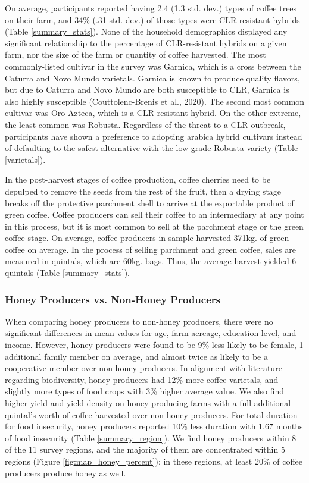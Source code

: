 \documentclass[../main.tex]{subfiles}
\begin{document}
On average, participants reported having 2.4 (1.3 std. dev.) types of coffee trees on their farm, and 34\% (.31 std. dev.) of those types were CLR-resistant hybrids (Table \ref{summary_stats}). None of the household demographics displayed any significant relationship to the percentage of CLR-resistant hybrids on a given farm, nor the size of the farm or quantity of coffee harvested.  The most commonly-listed cultivar in the survey was Garnica, which is a cross between the Caturra and Novo Mundo varietals. Garnica is known to produce quality flavors, but due to Caturra and Novo Mundo are both susceptible to CLR, Garnica is also highly susceptible (Couttolenc-Brenis et al., 2020). The second most common cultivar was Oro Azteca, which is a CLR-resistant hybrid. On the other extreme, the least common was Robusta. Regardless of the threat to a CLR outbreak, participants have shown a preference to adopting arabica hybrid cultivars instead of defaulting to the safest alternative with the low-grade Robusta variety (Table \ref{varietals}).

In the post-harvest stages of coffee production, coffee cherries need to be depulped to remove the seeds from the rest of the fruit,  then a drying stage breaks off the protective parchment shell to arrive at the exportable product of green coffee. Coffee producers can sell their coffee to an intermediary at any point in this process, but it is most common to sell at the parchment stage or the green coffee stage. On average, coffee producers in sample harvested 371kg. of green coffee on average. In the process of selling parchment and green coffee, sales are measured in quintals, which are 60kg. bags. Thus, the average harvest yielded 6 quintals (Table \ref{summary_stats}). 

\subsubsection{Honey Producers vs. Non-Honey Producers}

When comparing honey producers to non-honey producers, there were no significant differences in mean values for age, farm acreage, education level, and income. However, honey producers were found to be 9\% less likely to be female, 1 additional family member on average, and almost twice as likely to be a cooperative member over non-honey producers. In alignment with literature regarding biodiversity, honey producers had 12\% more coffee varietals, and slightly more types of food crops with 3\% higher average value. We also find higher yield and yield density on honey-producing farms with a full additional quintal’s worth of coffee harvested over non-honey producers. For total duration for food insecurity, honey producers reported 10\% less duration with 1.67 months of food insecurity (Table \ref{summary_region}). We find honey producers within 8 of the 11 survey regions, and the majority of them are concentrated within 5 regions (Figure \ref{fig:map_honey_percent}); in these regions, at least 20\% of coffee producers produce honey as well. 
\end{document}
